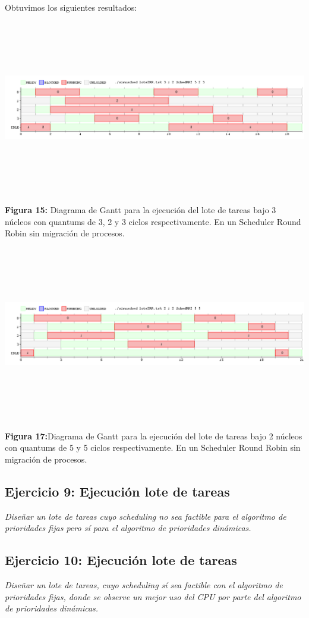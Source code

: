 \documentclass[a4paper]{article}
\begin{document}
Obtuvimos los siguientes resultados:\newline
	
\includegraphics[width=\textwidth,height=3.0in,keepaspectratio
]{imagenes/ej8/2eje4.png} \newline
\begin {flushleft}
\textbf{Figura 15:} Diagrama de Gantt para la ejecuci\'on del lote de tareas bajo 3 n\'ucleos con quantums de 3, 2 y 3 ciclos respectivamente. En un Scheduler Round Robin sin migración de procesos.
\end{flushleft}	
	

\includegraphics[width=\textwidth,height=3.0in,keepaspectratio
]{imagenes/ej8/2eje6.png} \newline
\begin {flushleft}
\textbf{Figura 17:}Diagrama de Gantt para la ejecuci\'on del lote de tareas bajo 2 n\'ucleos con quantums de 5 y 5 ciclos respectivamente. En un Scheduler Round Robin sin migración de procesos.
\end{flushleft}	
 
\newpage
 \subsection{Ejercicio 9:  Ejecuci\'on lote de tareas}
\textit{Dise\~nar un lote de tareas cuyo scheduling no sea factible para el algoritmo de prioridades fijas pero s\'i para el algoritmo de prioridades din\'amicas.}
\newpage
 \subsection{Ejercicio 10:  Ejecuci\'on lote de tareas}
\textit{Dise\~nar un lote de tareas, cuyo scheduling s\'i sea factible con el algoritmo de prioridades fijas, donde se observe un mejor uso del CPU por parte del algoritmo de prioridades din\'amicas.}
\end{document}
